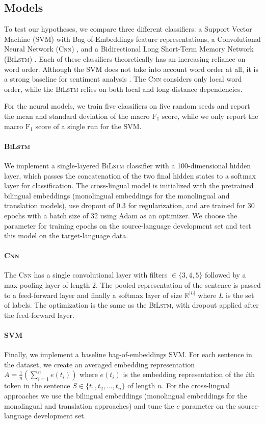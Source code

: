\documentclass[a4paper,11pt,twocolumn,twoside]{article}
\newcommand{\R}{\mathbb{R}}
\newcommand{\bilstm}{\textsc{BiLstm}\xspace}
\newcommand{\cnn}{\textsc{Cnn}\xspace}
\newcommand{\F}{$\text{F}_1$\xspace}
\begin{document}
\subsection{Models}

To test our hypotheses, we compare three different classifiers: a Support Vector Machine (SVM) with Bag-of-Embeddings feature representations, a Convolutional Neural Network (\cnn) \cite{Santos2014,Severyn2015}, and a Bidirectional Long Short-Term Memory Network (\bilstm) \cite{Luong2015}. Each of these classifiers theoretically has an increasing reliance on word order. Although the SVM does not take into account word order at all, it is a strong baseline for sentiment analysis \cite{Kiritchenko2014c}. The \cnn considers only local word order, while the \bilstm relies on both local and long-distance dependencies. 

For the neural models, we train five classifiers on five random seeds and report the mean and standard deviation of the macro \F score, while we only report the macro \F score of a single run for the SVM.

\paragraph{\bilstm} We implement a single-layered \bilstm classifier with a 100-dimensional hidden layer, which passes the concatenation of the two final hidden states to a softmax layer for classification. The cross-lingual model is initialized with the pretrained bilingual embeddings (monolingual embeddings for the monolingual and translation models), use dropout of $0.3$ for regularization, and are trained for 30 epochs with a batch size of 32 using Adam as an optimizer. We choose the parameter for training epochs on the source-language development set and test this model on the target-language data.

\paragraph{\cnn} The \cnn has a single convolutional layer with filters $\in \{3,4,5\}$ followed by a max-pooling layer of length $2$. The pooled representation of the sentence is passed to a feed-forward layer and finally a softmax layer of size $\R^{|L|}$ where $L$ is the set of labels. The optimization is the same as the \bilstm, with dropout applied after the feed-forward layer.

\paragraph{SVM}
 Finally, we implement a baseline bag-of-embeddings SVM. For each sentence in the dataset, we create an averaged embedding representation $A= \frac{1}{n} (\sum_{i=1}^{n} e(t_{i}))$ where $e(t_{i})$ is the embedding representation of the $i$th token in the sentence $S \in \{t_{1}, t_{2}, \ldots, t_{n}\}$ of length $n$. For the cross-lingual approaches we use the bilingual embeddings (monolingual embeddings for the monolingual and translation approaches) and tune the $c$ parameter on the source-language development set.
\end{document}
